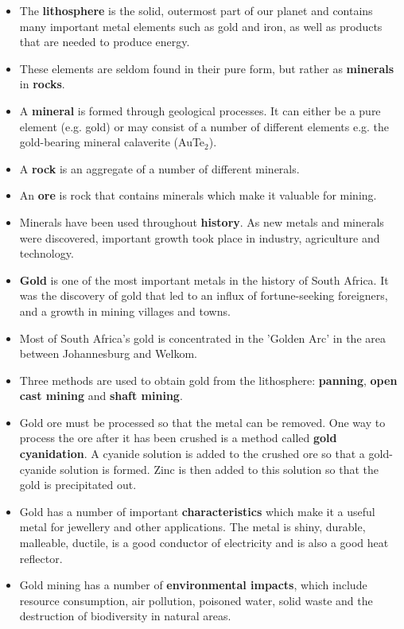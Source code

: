 
\begin{itemize}
\item{The \textbf{lithosphere} is the solid, outermost part of our planet and contains many important metal elements such as gold and iron, as well as products that are needed to produce energy.}
\item{These elements are seldom found in their pure form, but rather as \textbf{minerals} in \textbf{rocks}.}
\item{A \textbf{mineral} is formed through geological processes. It can either be a pure element (e.g.\@{} gold) or may consist of a number of different elements e.g.\@{} the gold-bearing mineral calaverite (AuTe$_{2}$).}
\item{A \textbf{rock} is an aggregate of a number of different minerals.}
\item{An \textbf{ore} is rock that contains minerals which make it valuable for mining.}
\item{Minerals have been used throughout \textbf{history}. As new metals and minerals were discovered, important growth took place in industry, agriculture and technology.}
\item{\textbf{Gold} is one of the most important metals in the history of South Africa. It was the discovery of gold that led to an influx of fortune-seeking foreigners, and a growth in mining villages and towns.}
\item{Most of South Africa's gold is concentrated in the 'Golden Arc' in the area between Johannesburg and Welkom.}
\item{Three methods are used to obtain gold from the lithosphere: \textbf{panning}, \textbf{open cast mining} and \textbf{shaft mining}.}
\item{Gold ore must be processed so that the metal can be removed. One way to process the ore after it has been crushed is a method called \textbf{gold cyanidation}. A cyanide solution is added to the crushed ore so that a gold-cyanide solution is formed. Zinc is then added to this solution so that the gold is precipitated out.}
\item{Gold has a number of important \textbf{characteristics} which make it a useful metal for jewellery and other applications. The metal is shiny, durable, malleable, ductile, is a good conductor of electricity and is also a good heat reflector.}
\item{Gold mining has a number of \textbf{environmental impacts}, which include resource consumption, air pollution, poisoned water, solid waste and the destruction of biodiversity in natural areas.}

\end{itemize}
